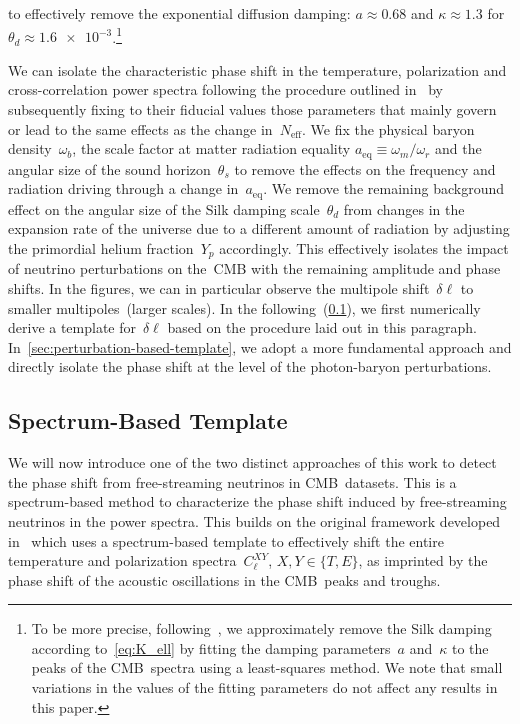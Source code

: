 \documentclass[11pt]{article}
\numberwithin{equation}{section}
\newcommand{\Neff}{N_\mathrm{eff}}
\begin{document}
to effectively remove the exponential diffusion damping: $a \approx 0.68$ and $\kappa \approx 1.3$ for $\theta_d \approx \num{1.6e-3}$.\footnote{To be more precise, following~\cite{Wallisch:2018rzj}, we approximately remove the Silk damping according to~\eqref{eq:K_ell} by fitting the damping parameters~$a$ and~$\kappa$ to the peaks of the CMB~spectra using a least-squares method. We note that small variations in the values of the fitting parameters do not affect any results in this paper.}\medskip

We can isolate the characteristic phase shift in the temperature, polarization and cross-correlation power spectra following the procedure outlined in~\cite{Follin:2015hya, Wallisch:2018rzj} by subsequently fixing to their fiducial values those parameters that mainly govern or lead to the same effects as the change in~$\Neff$. We fix the physical baryon density~$\omega_b$, the scale factor at matter radiation equality $a_\mathrm{eq} \equiv \omega_m/\omega_r$ and the angular size of the sound horizon~$\theta_s$ to remove the effects on the frequency and radiation driving through a change in~$a_\mathrm{eq}$. We remove the remaining background effect on the angular size of the Silk damping scale~$\theta_d$ from changes in the expansion rate of the universe due to a different amount of radiation by adjusting the primordial helium fraction~$Y_p$ accordingly. This effectively isolates the impact of neutrino perturbations on the~CMB with the remaining amplitude and phase shifts. In the figures, we can in particular observe the multipole shift~$\delta\ell$ to smaller multipoles~(larger scales). In the following~(\textsection\ref{sec:spectrum-based-template}), we first numerically derive a template for~$\delta\ell$ based on the procedure laid out in this paragraph. In~\textsection\ref{sec:perturbation-based-template}, we adopt a more fundamental approach and directly isolate the phase shift at the level of the photon-baryon perturbations.


\subsection{Spectrum-Based Template}
\label{sec:spectrum-based-template}

We will now introduce one of the two distinct approaches of this work to detect the phase shift from free-streaming neutrinos in CMB~datasets. This is a spectrum-based method to characterize the phase shift induced by free-streaming neutrinos in the power spectra. This builds on the original framework developed in~\cite{Follin:2015hya} which uses a spectrum-based template to effectively shift the entire temperature and polarization spectra~$C_\ell^{XY}$, $X,Y \in \{T, E\}$, as imprinted by the phase shift of the acoustic oscillations in the CMB~peaks and troughs.
\end{document}
